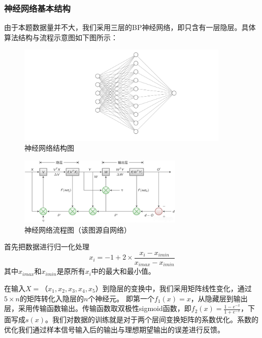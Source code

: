 \documentclass{article}
\begin{document}
	\subsubsection{神经网络基本结构}
	由于本题数据量并不大，我们采用三层的BP神经网络，即只含有一层隐层。具体算法结构与流程示意图如下图所示：
	\begin{figure}[!h]
		\centering 
		\includegraphics[width=0.9\textwidth]{nn.png}
		\caption{神经网络结构图}
	\end{figure}
	\begin{figure}[!h]
		\centering 
		\includegraphics[width=0.7\textwidth]{nn流程图.jpg}
		\caption{神经网络流程图（该图源自网络）}
	\end{figure}
	
	首先把数据进行归一化处理
	\begin{equation}
		x_i=-1+2\times\frac{x_i-x_{imin}}{x_{imax}-x_{imin}}
	\end{equation}
	其中$x_{imax}$和$x_{imin}$是原所有$x_i$中的最大和最小值。
	
	在输入$X=（x_1,x_2,x_3,x_4,x_5）$到隐层的变换中，我们采用矩阵线性变化，通过$5\times n$的矩阵转化入隐层的$n$个神经元。
	即第一个$f_1(x)=x$，从隐藏层到输出层，采用传输函数输出。传输函数取双极性sigmoid函数，即$f_2(x)=\frac{1-e^{-x}}{1+e^{-x}}$，下面写成$s(x)$。我们对数据的训练就是对于两个层间变换矩阵的系数优化。系数的优化我们通过样本信号输入后的输出与理想期望输出的误差进行反馈。
	
\end{document}
